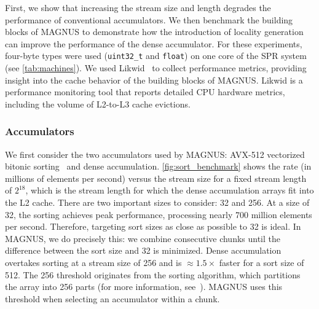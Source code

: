 First, we show that increasing the stream size and length degrades the performance of conventional accumulators.
We then benchmark the building blocks of MAGNUS to demonstrate how the introduction of locality generation can improve the performance of the dense accumulator.
For these experiments, four-byte types were used (\texttt{uint32\_t} and \texttt{float}) on one core of the SPR system (see \autoref{tab:machines}).
We used Likwid~\cite{likwid} to collect performance metrics, providing insight into the cache behavior of the building blocks of MAGNUS.
Likwid is a performance monitoring tool that reports detailed CPU hardware metrics, including the volume of L2-to-L3 cache evictions.

\subsubsection{Accumulators}\label{sec:results_sort}
We first consider the two accumulators used by MAGNUS: AVX-512 vectorized bitonic sorting~\cite{AVX512sort} and dense accumulation.
\autoref{fig:sort_benchmark} shows the rate (in millions of elements per second) versus the stream size for a fixed stream length of $2^{18}$, which is the stream length for which the dense accumulation arrays fit into the L2 cache.
There are two important sizes to consider: 32 and 256. At a size of 32, the sorting achieves peak performance, processing nearly 700 million elements per second. Therefore, targeting sort sizes as close as possible to 32 is ideal.
In MAGNUS, we do precisely this: we combine consecutive chunks until the difference between the sort size and 32 is minimized.
Dense accumulation overtakes sorting at a stream size of 256 and is $\approx 1.5\times$ faster for a sort size of 512.
The 256 threshold originates from the sorting algorithm, which partitions the array into 256 parts (for more information, see~\cite{AVX512sort}).
MAGNUS uses this threshold when selecting an accumulator within a chunk.

